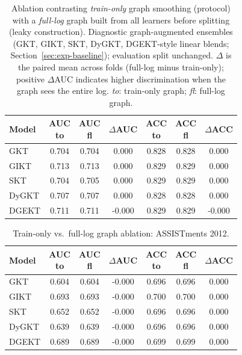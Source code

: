\begin{table}[t]
\centering
\scriptsize
\setlength{\tabcolsep}{2pt}
\caption{Ablation contrasting \emph{train-only} graph smoothing (protocol) with a \emph{full-log} graph built from all learners before splitting (leaky construction). Diagnostic graph-augmented ensembles (GKT, GIKT, SKT, DyGKT, DGEKT-style linear blends; Section~\ref{sec:exp-baseline}); evaluation split unchanged. $\Delta$ is the paired mean across folds (full-log minus train-only); positive $\Delta$AUC indicates higher discrimination when the graph sees the entire log. \emph{to}: train-only graph; \emph{fl}: full-log graph.}
\label{tab:graph-ablation}
\label{tab:graph-ablation-junyi}
\begin{tabular}{@{} >{\RaggedRight\arraybackslash}p{12mm} *{6}{c} @{}}
\toprule
Model & \makecell{AUC\\to} & \makecell{AUC\\fl} & $\Delta$AUC & \makecell{ACC\\to} & \makecell{ACC\\fl} & $\Delta$ACC \\
\midrule
GKT & 0.704 & 0.704 & 0.000 & 0.828 & 0.828 & 0.000 \\
GIKT & 0.713 & 0.713 & 0.000 & 0.829 & 0.829 & 0.000 \\
SKT & 0.704 & 0.705 & 0.000 & 0.829 & 0.829 & 0.000 \\
DyGKT & 0.707 & 0.707 & 0.000 & 0.828 & 0.828 & 0.000 \\
DGEKT & 0.711 & 0.711 & -0.000 & 0.829 & 0.829 & -0.000 \\
\bottomrule
\end{tabular}
\end{table}

\begin{table}[t]
\centering
\scriptsize
\setlength{\tabcolsep}{2pt}
\caption{Train-only vs.\ full-log graph ablation: ASSISTments 2012.}
\label{tab:graph-ablation-assist2012}
\begin{tabular}{@{} >{\RaggedRight\arraybackslash}p{12mm} *{6}{c} @{}}
\toprule
Model & \makecell{AUC\\to} & \makecell{AUC\\fl} & $\Delta$AUC & \makecell{ACC\\to} & \makecell{ACC\\fl} & $\Delta$ACC \\
\midrule
GKT & 0.604 & 0.604 & -0.000 & 0.696 & 0.696 & 0.000 \\
GIKT & 0.693 & 0.693 & -0.000 & 0.700 & 0.700 & 0.000 \\
SKT & 0.652 & 0.652 & -0.000 & 0.696 & 0.696 & 0.000 \\
DyGKT & 0.639 & 0.639 & -0.000 & 0.696 & 0.696 & 0.000 \\
DGEKT & 0.689 & 0.689 & -0.000 & 0.699 & 0.699 & 0.000 \\
\bottomrule
\end{tabular}
\end{table}

